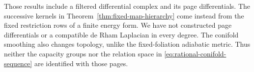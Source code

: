 Those results include a filtered
differential complex and its page
differentials. The successive kernels
in Theorem~\ref{thm:fixed-map-hierarchy}
come instead from the fixed restriction
rows of a finite energy form.
We have not constructed page differentials
or a compatible de Rham Laplacian in
every degree. The conifold smoothing
also changes topology, unlike the
fixed-foliation adiabatic metric.
Thus neither the capacity groups nor
the relation space in
\eqref{eq:rational-conifold-sequence}
are identified with those pages.
